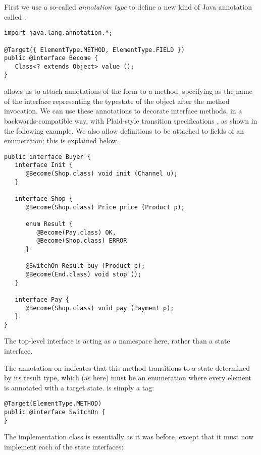 First we use a so-called \emph{annotation type} to define a new kind
of Java annotation called :

\begin{lstlisting}
import java.lang.annotation.*;

@Target({ ElementType.METHOD, ElementType.FIELD })
public @interface Become {
   Class<? extends Object> value ();
}
\end{lstlisting}

\noindent {} allows us to attach annotations of the form
 to a method, specifying  as the
name of the interface representing the typestate of the object after
the method invocation. We can use these annotations to decorate
interface methods, in a backwards-compatible way, with Plaid-style
transition specifications \cite{garcia14}, as shown in the following
example. We also allow  definitions to be attached to
fields of an enumeration; this is explained below.

\begin{lstlisting}
public interface Buyer {
   interface Init {
      @Become(Shop.class) void init (Channel u);
   }

   interface Shop {
      @Become(Shop.class) Price price (Product p);

      enum Result {
         @Become(Pay.class) OK,
         @Become(Shop.class) ERROR
      }

      @SwitchOn Result buy (Product p);
      @Become(End.class) void stop ();
   }

   interface Pay {
      @Become(Shop.class) void pay (Payment p);
   }
}
\end{lstlisting}

\noindent The top-level  interface is acting as a
namespace here, rather than a state interface.

The  annotation on  indicates that this method
transitions to a state determined by its result type, which (as here)
must be an enumeration where every element is annotated with a target
state.  is simply a tag:
\begin{lstlisting}
@Target(ElementType.METHOD)
public @interface SwitchOn {
}
\end{lstlisting}

The implementation class  is essentially as it was
before, except that it must now implement each of the state
interfaces:

